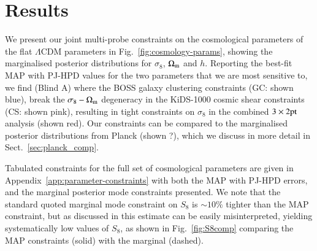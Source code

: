 \section{Results}
\label{sec:results}
We present our joint multi-probe constraints on the cosmological parameters of the flat $\Lambda$CDM parameters in Fig.~\ref{fig:cosmology-params}, showing the marginalised posterior distributions for $\sigma_8$, $\Omega_{\rm m}$ and $h$.   Reporting the best-fit MAP with PJ-HPD values for the two parameters that we are most sensitive to, we find (Blind A)
where the BOSS galaxy clustering constraints (GC: shown blue), break the $\sigma_8-\Omega_{\rm m}$ degeneracy in the KiDS-1000 cosmic shear constraints (CS: shown pink), resulting in tight constraints on $\sigma_8$ in the combined $3\times2{\rm pt}$ analysis (shown red).   Our constraints can be compared to the marginalised posterior distributions from Planck (shown ?), which we discuss in more detail in Sect.~\ref{sec:planck_comp}.

Tabulated constraints for the full set of cosmological parameters are given in Appendix~\ref{app:parameter-constraints} with both the MAP with PJ-HPD errors, and the marginal posterior mode constraints presented.   We note that the standard quoted marginal mode constraint on $S_8$ is $\sim 10\%$ tighter than the MAP constraint, but as discussed in \citet{joachimi/etal:inprep} this estimate can be easily misinterpreted, yielding systematically low values of $S_8$, as shown in Fig.~\ref{fig:S8comp} comparing the MAP constraints (solid) with the marginal (dashed).  

